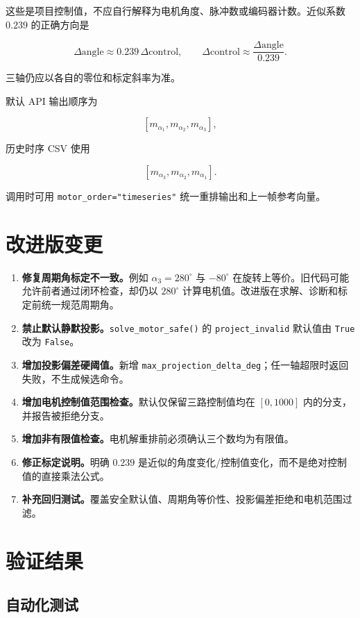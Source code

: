 \documentclass[11pt,a4paper,fontset=none]{ctexart}
\begin{document}
这些是项目控制值，不应自行解释为电机角度、脉冲数或编码器计数。近似系数 $0.239$ 的正确方向是

\[
\Delta\text{angle}\approx0.239\,\Delta\text{control},
\qquad
\Delta\text{control}\approx\frac{\Delta\text{angle}}{0.239}.
\]

三轴仍应以各自的零位和标定斜率为准。

默认 API 输出顺序为

\[
[m_{\alpha_1},m_{\alpha_2},m_{\alpha_3}],
\]

历史时序 CSV 使用

\[
[m_{\alpha_3},m_{\alpha_2},m_{\alpha_1}].
\]

调用时可用 \texttt{motor\_order="timeseries"} 统一重排输出和上一帧参考向量。

\section{改进版变更}

\begin{enumerate}
  \item \textbf{修复周期角标定不一致。}例如 $\alpha_3=280^\circ$ 与 $-80^\circ$ 在旋转上等价。旧代码可能允许前者通过闭环检查，却仍以 $280^\circ$ 计算电机值。改进版在求解、诊断和标定前统一规范周期角。
  \item \textbf{禁止默认静默投影。}\texttt{solve\_motor\_safe()} 的 \texttt{project\_invalid} 默认值由 \texttt{True} 改为 \texttt{False}。
  \item \textbf{增加投影偏差硬阈值。}新增 \texttt{max\_projection\_delta\_deg}；任一轴超限时返回失败，不生成候选命令。
  \item \textbf{增加电机控制值范围检查。}默认仅保留三路控制值均在 $[0,1000]$ 内的分支，并报告被拒绝分支。
  \item \textbf{增加非有限值检查。}电机解重排前必须确认三个数均为有限值。
  \item \textbf{修正标定说明。}明确 $0.239$ 是近似的角度变化/控制值变化，而不是绝对控制值的直接乘法公式。
  \item \textbf{补充回归测试。}覆盖安全默认值、周期角等价性、投影偏差拒绝和电机范围过滤。
\end{enumerate}

\section{验证结果}

\subsection{自动化测试}
\end{document}
